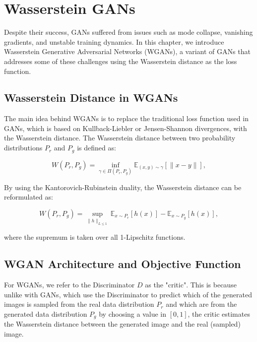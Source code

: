 \chapter{Wasserstein GANs}
\label{chp:WGANs}

Despite their success, GANs suffered from issues such as mode collapse, vanishing gradients, and unstable training dynamics. In this chapter, we introduce Wasserstein Generative Adversarial Networks (WGANs), a variant of GANs that addresses some of these challenges using the Wasserstein distance as the loss function.

\section{Wasserstein Distance in WGANs}

The main idea behind WGANs is to replace the traditional loss function used in GANs, which is based on Kullback-Liebler or Jensen-Shannon divergences, with the Wasserstein distance. The Wasserstein distance between two probability distributions $P_r$ and $P_g$ is defined as:

\begin{equation}
W(P_r, P_g) = \inf_{\gamma \in \Pi(P_r, P_g)} \mathbb{E}_{(x, y) \sim \gamma} [\lVert x - y \rVert],
\end{equation}

By using the Kantorovich-Rubinstein duality, the Wasserstein distance can be reformulated as:

\begin{equation}
W(P_r, P_g) = \sup_{\lVert h \rVert_{L \leq 1}} \mathbb{E}_{x \sim P_r} [h(x)] - \mathbb{E}_{x \sim P_g} [h(x)],
\end{equation}

where the supremum is taken over all 1-Lipschitz functions.

\section{WGAN Architecture and Objective Function}

For WGANs, we refer to the Discriminator $D$ as the "critic". This is because unlike with GANs, which use the Discriminator to predict which of the generated images is sampled from the real data distribution $P_r$ and which are from the generated data distribution $P_g$ by choosing a value in $[0,1]$, the critic estimates the Wasserstein distance between the generated image and the real (sampled) image.

